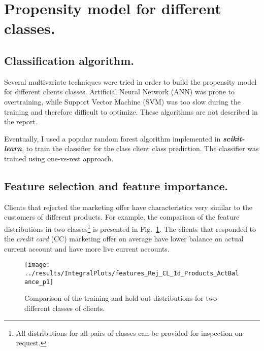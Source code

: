 \documentclass[14pt]{scrartcl}
\begin{document}
\section{Propensity model for different classes.}\label{sec:mva_classifier}
\subsection{Classification algorithm.}
Several multivariate techniques were tried in order to build the propensity model
for different clients classes.
Artificial Neural Network (ANN) was prone to overtraining, while Support Vector Machine (SVM) 
was too slow during the training and therefore difficult to optimize.
These algorithms are not described in the report.

Eventually, I used a popular random forest algorithm implemented in \textbf{\textsl{scikit-learn}},
to train the classifier for the class client class prediction. The classifier was trained 
using one-vs-rest approach.

\subsection{Feature selection and feature importance.}
Clients that rejected the marketing offer have characteristics very similar to
the customers of different products. For example, the comparison of the feature
distributions in two classes\footnote{All distributions for all pairs of
classes can be provided for inspection on request.}
is presented in Fig.~\ref{fig:input_features_class_comparison}. The 
clients that responded to the \textit{credit card} (CC) marketing offer on average
have lower balance on actual current account and have more live current accounts.
\begin{figure}[htpb!]
    \centering
    \texttt{[image: ../results/IntegralPlots/features\_Rej\_CL\_1d\_Products\_ActBalance\_p1]}\\
    \caption{Comparison of the training and hold-out distributions for two different
    classes of clients.}
    \label{fig:input_features_class_comparison}
 \end{figure}
\end{document}

